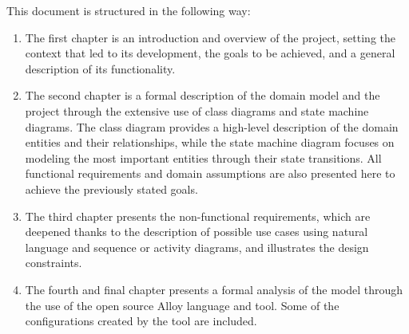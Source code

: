 \documentclass[../../main.tex]{subfiles}
\begin{document}
This document is structured in the following way:

\begin{enumerate}
    \item The first chapter is an introduction and overview of the project, setting the context that led to its development, the goals to be achieved, and a general description of its functionality.

    \item The second chapter is a formal description of the domain model and the project through the extensive use of class diagrams and state machine diagrams. The class diagram provides a high-level description of the domain entities and their relationships, while the state machine diagram focuses on modeling the most important entities through their state transitions. All functional requirements and domain assumptions are also presented here to achieve the previously stated goals.

    \item The third chapter presents the non-functional requirements, which are deepened thanks to the description of possible use cases using natural language and sequence or activity diagrams, and illustrates the design constraints.

    \item The fourth and final chapter presents a formal analysis of the model through the use of the open source Alloy language and tool. Some of the configurations created by the tool are included.
\end{enumerate}
\end{document}
